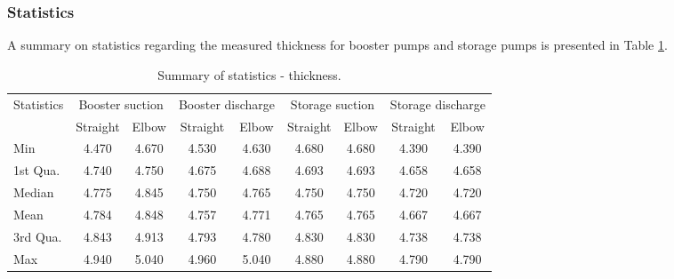 \subsubsection{Statistics} \label{ch05_statistics}
A summary on statistics regarding the measured thickness for booster pumps and storage pumps is presented in Table \ref{ch05_tbl_thicknesssta}.
\begin{table}[h]
	\caption{Summary of statistics - thickness.}
	\label{ch05_tbl_thicknesssta}
	{\footnotesize
\begin{tabular}{l|l|l|l|l|l|l|l|l}
\hline
Statistics & \multicolumn{2}{c|}{Booster suction} & \multicolumn{2}{c|}{Booster discharge} & \multicolumn{2}{c|}{Storage suction} & \multicolumn{2}{c}{Storage discharge} \\ 
\cline{2-9}
& \multicolumn{1}{c|}{Straight} & \multicolumn{1}{c|}{Elbow} & \multicolumn{1}{c|}{Straight} & \multicolumn{1}{c|}{Elbow} & \multicolumn{1}{c|}{Straight} & \multicolumn{1}{c|}{Elbow} & \multicolumn{1}{c|}{Straight} & \multicolumn{1}{c}{Elbow} \\ 
\hline
Min & \multicolumn{1}{c|}{4.470} & \multicolumn{1}{c|}{4.670} & \multicolumn{1}{c|}{4.530} & \multicolumn{1}{c|}{4.630} & \multicolumn{1}{c|}{4.680} & \multicolumn{1}{c|}{4.680} & \multicolumn{1}{c|}{4.390} & \multicolumn{1}{c}{4.390} \\ 
1st Qua. & \multicolumn{1}{c|}{4.740} & \multicolumn{1}{c|}{4.750} & \multicolumn{1}{c|}{4.675} & \multicolumn{1}{c|}{4.688} & \multicolumn{1}{c|}{4.693} & \multicolumn{1}{c|}{4.693} & \multicolumn{1}{c|}{4.658} & \multicolumn{1}{c}{4.658} \\ 
Median & \multicolumn{1}{c|}{4.775} & \multicolumn{1}{c|}{4.845} & \multicolumn{1}{c|}{4.750} & \multicolumn{1}{c|}{4.765} & \multicolumn{1}{c|}{4.750} & \multicolumn{1}{c|}{4.750} & \multicolumn{1}{c|}{4.720} & \multicolumn{1}{c}{4.720} \\ 
Mean & \multicolumn{1}{c|}{4.784} & \multicolumn{1}{c|}{4.848} & \multicolumn{1}{c|}{4.757} & \multicolumn{1}{c|}{4.771} & \multicolumn{1}{c|}{4.765} & \multicolumn{1}{c|}{4.765} & \multicolumn{1}{c|}{4.667} & \multicolumn{1}{c}{4.667} \\ 
3rd Qua. & \multicolumn{1}{c|}{4.843} & \multicolumn{1}{c|}{4.913} & \multicolumn{1}{c|}{4.793} & \multicolumn{1}{c|}{4.780} & \multicolumn{1}{c|}{4.830} & \multicolumn{1}{c|}{4.830} & \multicolumn{1}{c|}{4.738} & \multicolumn{1}{c}{4.738} \\ 
Max & \multicolumn{1}{c|}{4.940} & \multicolumn{1}{c|}{5.040} & \multicolumn{1}{c|}{4.960} & \multicolumn{1}{c|}{5.040} & \multicolumn{1}{c|}{4.880} & \multicolumn{1}{c|}{4.880} & \multicolumn{1}{c|}{4.790} & \multicolumn{1}{c}{4.790} \\ 
\hline
\end{tabular}
	}
\end{table}

